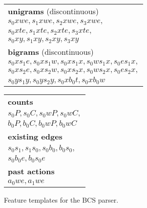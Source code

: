 \documentclass[11pt]{article}
\begin{document}
\begin{figure*}
\begin{adjustbox}{width=\textwidth}
\begin{minipage}[c][11cm][t]{.5\textwidth}
\vspace*{\fill}
\begin{tabular}{l}
\textbf{unigrams} (discontinuous) \\
$s_0xwe, s_1xwe, s_2xwe, s_3xwe,$ \\
$s_0xte, s_1xte, s_2xte, s_3xte,$ \\
$s_0xy, s_1xy, s_2xy, s_3xy$ \\
\textbf{bigrams} (discontinuous) \\
$s_0xs_1e, s_0xs_1w, s_0xs_1x, s_0ws_1x, s_0es_1x,$ \\
$s_0xs_2e, s_0xs_2w, s_0xs_2x, s_0ws_2x, s_0es_2x,$ \\
$s_0ys_1y, s_0ys_2y, s_0xb_0t, s_0xb_0w$
\end{tabular}

\vspace*{\fill}
\begin{tabular}{l}
\textbf{counts} \\
$s_0P, s_0C, s_0wP, s_0wC,$ \\
$b_0P, b_0C, b_0wP, b_0wC$ \\
\textbf{existing edges} \\
$s_0s_1, s_1s_0, s_0b_0, b_0s_0,$ \\
$s_0b_0e, b_0s_0e$ \\
\textbf{past actions} \\
$a_0we, a_1we$
\end{tabular}

\end{minipage}
\end{adjustbox}
\caption{Feature templates for the \textsc{BCS} parser.\label{fig:features}}
\end{figure*}
\end{document}
